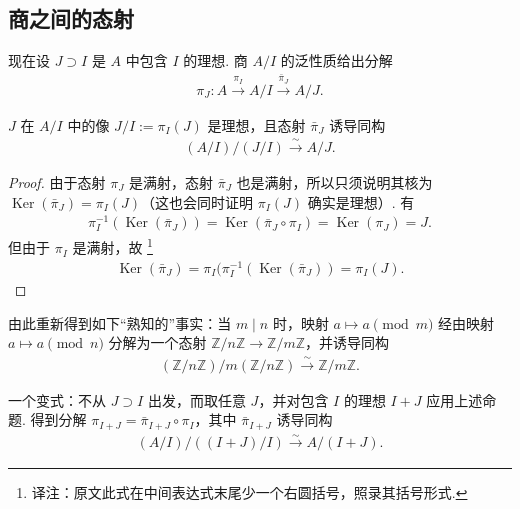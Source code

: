 \subsection{商之间的态射}\label{sec:galois-1-2-12}
现在设 $J\supset I$ 是 $A$ 中包含 $I$ 的理想. 商 $A/I$ 的泛性质给出分解
\begin{align*}
\pi_J\colon A\xrightarrow{\pi_I}A/I\xrightarrow{\bar\pi_J}A/J.
\end{align*}
\begin{proposition*}
$J$ 在 $A/I$ 中的像 $J/I:=\pi_I(J)$ 是理想，且态射 $\bar\pi_J$ 诱导同构
\begin{align*}
(A/I)/(J/I)\xrightarrow{\sim}A/J.
\end{align*}
\end{proposition*}
\begin{proof}
由于态射 $\pi_J$ 是满射，态射 $\bar\pi_J$ 也是满射，所以只须说明其核为 $\operatorname{Ker}(\bar\pi_J)=\pi_I(J)$（这也会同时证明 $\pi_I(J)$ 确实是理想）. 有
\begin{align*}
\pi_I^{-1}(\operatorname{Ker}(\bar\pi_J))
=\operatorname{Ker}(\bar\pi_J\circ\pi_I)
=\operatorname{Ker}(\pi_J)=J.
\end{align*}
但由于 $\pi_I$ 是满射，故
\footnote{译注：原文此式在中间表达式末尾少一个右圆括号，照录其括号形式.}
\begin{align*}
\operatorname{Ker}(\bar\pi_J)
=\pi_I(\pi_I^{-1}(\operatorname{Ker}(\bar\pi_J))
=\pi_I(J).
\end{align*}
\end{proof}
\begin{example*}
由此重新得到如下``熟知的''事实：当 $m\mid n$ 时，映射 $a\mapsto a\pmod m$ 经由映射 $a\mapsto a\pmod n$ 分解为一个态射 $\mathbb Z/n\mathbb Z\longrightarrow\mathbb Z/m\mathbb Z$，并诱导同构
\begin{align*}
(\mathbb Z/n\mathbb Z)/m(\mathbb Z/n\mathbb Z)\xrightarrow{\sim}\mathbb Z/m\mathbb Z.
\end{align*}
\end{example*}
一个变式：不从 $J\supset I$ 出发，而取任意 $J$，并对包含 $I$ 的理想 $I+J$ 应用上述命题. 得到分解 $\pi_{I+J}=\bar\pi_{I+J}\circ\pi_I$，其中 $\bar\pi_{I+J}$ 诱导同构
\begin{align*}
(A/I)/((I+J)/I)\xrightarrow{\sim}A/(I+J).
\end{align*}

